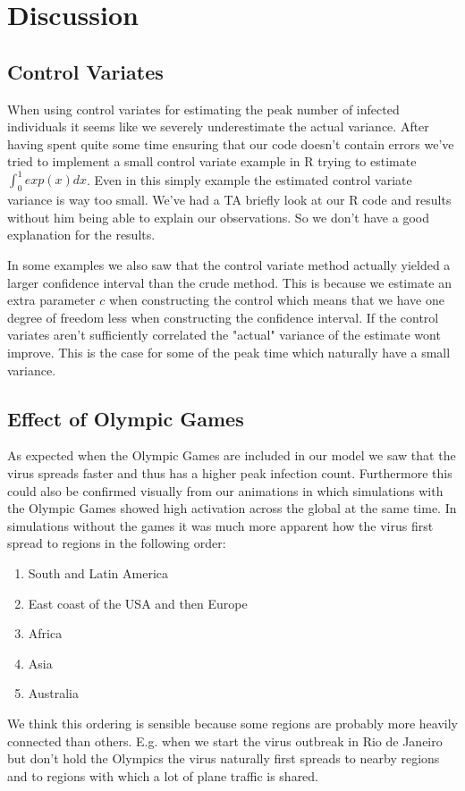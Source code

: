 
\section{Discussion}
\subsection{Control Variates}
When using control variates for estimating the peak number of infected individuals it seems like we severely underestimate the actual variance. After having spent quite some time ensuring that our code doesn't contain errors we've tried to implement a small control variate example in R trying to estimate $\int_0^1 exp(x) dx$. Even in this simply example the estimated control variate variance is way too small. We've had a TA briefly look at our R code and results without him being able to explain our observations. So we don't have a good explanation for the results.

In some examples we also saw that the control variate method actually yielded a larger confidence interval than the crude method. This is because we estimate an extra parameter $c$ when constructing the control which means that we have one degree of freedom less when constructing the confidence interval. If the control variates aren't sufficiently correlated the "actual" variance of the estimate wont improve. This is the case for some of the peak time which naturally have a small variance.

\subsection{Effect of Olympic Games}
As expected when the Olympic Games are included in our model we saw that the virus spreads faster and thus has a higher peak infection count. Furthermore this could also be confirmed visually from our animations in which simulations with the Olympic Games showed high activation across the global at the same time. In simulations without the games it was much more apparent how the virus first spread to regions in the following order:
\begin{enumerate}
	\item South and Latin America
	\item  East coast of the USA and then Europe
	\item Africa
	\item Asia
	\item Australia
\end{enumerate}

We think this ordering is sensible because some regions are probably more heavily connected than others. E.g. when we start the virus outbreak in Rio de Janeiro but don't hold the Olympics the virus naturally  first spreads to nearby regions and to regions with which a lot of plane traffic is shared.
